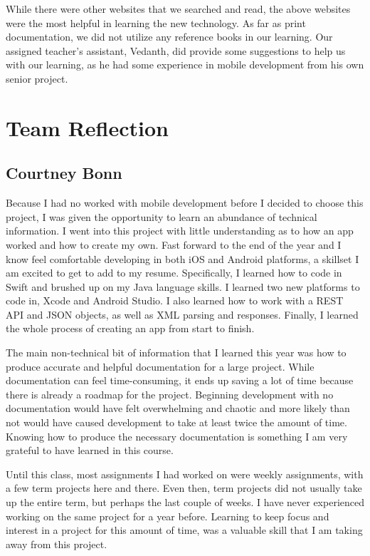 \documentclass[letterpaper,10pt,draftclsnofoot,onecolumn,titlepage]{IEEEtran}
\begin{document}
While there were other websites that we searched and read, the above websites were the most helpful in learning the new technology. 
As far as print documentation, we did not utilize any reference books in our learning. 
Our assigned teacher's assistant, Vedanth, did provide some suggestions to help us with our learning, as he had some experience in mobile development from his own senior project. 


\section{Team Reflection}

	\subsection{Courtney Bonn}
	
		Because I had no worked with mobile development before I decided to choose this project, I was given the opportunity to learn an abundance of technical information. 
		I went into this project with little understanding as to how an app worked and how to create my own. 
		Fast forward to the end of the year and I know feel comfortable developing in both iOS and Android platforms, a skillset I am excited to get to add to my resume.
		Specifically, I learned how to code in Swift and brushed up on my Java language skills.
		I learned two new platforms to code in, Xcode and Android Studio. 
		I also learned how to work with a REST API and JSON objects, as well as XML parsing and responses. 
		Finally, I learned the whole process of creating an app from start to finish. 
		
		The main non-technical bit of information that I learned this year was how to produce accurate and helpful documentation for a large project. 
		While documentation can feel time-consuming, it ends up saving a lot of time because there is already a roadmap for the project. 
		Beginning development with no documentation would have felt overwhelming and chaotic and more likely than not would have caused development to take at least twice the amount of time. 
		Knowing how to produce the necessary documentation is something I am very grateful to have learned in this course.
		
		Until this class, most assignments I had worked on were weekly assignments, with a few term projects here and there. 
		Even then, term projects did not usually take up the entire term, but perhaps the last couple of weeks. 
		I have never experienced working on the same project for a year before. 
		Learning to keep focus and interest in a project for this amount of time, was a valuable skill that I am taking away from this project.
		
\end{document}
